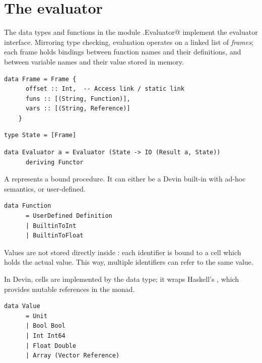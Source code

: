\documentclass[UdineBachThesis,american,11pt,draft]{PhdThesis}
\begin{document}
  \section{The evaluator}

  The data types and functions in the module \lstinline@Devin.Evaluator@
  implement the evaluator interface. Mirroring type checking, evaluation
  operates on a linked list of \emph{frames}; each frame holds bindings between
  function names and their definitions, and between variable names and their
  value stored in memory.

  \begin{lstlisting}[gobble=4,basicstyle=\ttfamily\small]
    data Frame = Frame {
      offset :: Int,  -- Access link / static link
      funs :: [(String, Function)],
      vars :: [(String, Reference)]
    }
  \end{lstlisting}

  \begin{lstlisting}[gobble=4,basicstyle=\ttfamily\small]
    type State = [Frame]
  \end{lstlisting}

  \begin{lstlisting}[gobble=4,basicstyle=\ttfamily\small]
    data Evaluator a = Evaluator (State -> IO (Result a, State))
      deriving Functor
  \end{lstlisting}

  A \lstinline@Function@ represents a bound procedure. It can either be a Devin
  built-in with ad-hoc semantics, or user-defined.

  \begin{lstlisting}[gobble=4,basicstyle=\ttfamily\small]
    data Function
      = UserDefined Definition
      | BuiltinToInt
      | BuiltinToFloat
  \end{lstlisting}

  Values are not stored directly inside \lstinline@State@: each identifier is
  bound to a cell which holds the actual value. This way, multiple identifiers
  can refer to the same value.

  In Devin, cells are implemented by the \lstinline@Reference@ data type; it
  wraps Haskell's \lstinline@IORef@, which provides mutable references in the
  \lstinline@IO@ monad.

  \begin{lstlisting}[gobble=4,basicstyle=\ttfamily\small]
    data Value
      = Unit
      | Bool Bool
      | Int Int64
      | Float Double
      | Array (Vector Reference)
  \end{lstlisting}
\end{document}
